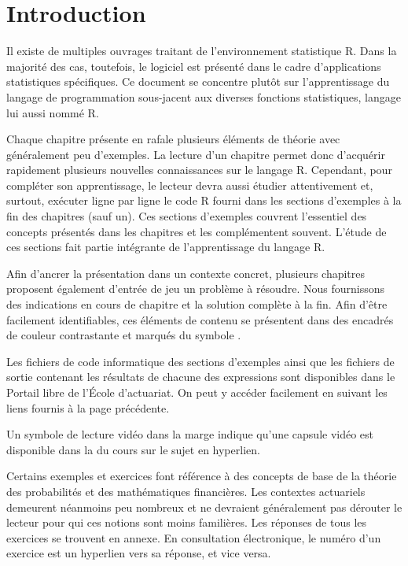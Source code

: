 \chapter*{Introduction}

Il existe de multiples ouvrages traitant de l'environnement
statistique R. Dans la majorité des cas, toutefois, le logiciel est
présenté dans le cadre d'applications statistiques spécifiques. Ce
document se concentre plutôt sur l'apprentissage du langage de
programmation sous-jacent aux diverses fonctions statistiques, langage
lui aussi nommé R.

Chaque chapitre présente en rafale plusieurs éléments de théorie avec
généralement peu d'exemples. La lecture d'un chapitre permet donc
d'acquérir rapidement plusieurs nouvelles connaissances sur le langage
R. Cependant, pour compléter son apprentissage, le lecteur devra aussi
étudier attentivement et, surtout, exécuter ligne par ligne le code R
fourni dans les sections d'exemples à la fin des chapitres (sauf un).
Ces sections d'exemples couvrent l'essentiel des concepts présentés
dans les chapitres et les complémentent souvent. L'étude de ces
sections fait partie intégrante de l'apprentissage du langage R.

Afin d'ancrer la présentation dans un contexte concret, plusieurs
chapitres proposent également d'entrée de jeu un problème à résoudre.
Nous fournissons des indications en cours de chapitre et la solution
complète à la fin. Afin d'être facilement identifiables, ces éléments
de contenu se présentent dans des encadrés de couleur contrastante et
marqués du symbole \faDotCircleO.

Les fichiers de code informatique des sections d'exemples ainsi que
les fichiers de sortie contenant les résultats de chacune des
expressions sont disponibles dans le Portail libre de l'École
d'actuariat. On peut y accéder facilement en suivant les liens fournis
à la page précédente.

Un symbole de lecture vidéo dans la marge indique qu'une capsule vidéo
est disponible dans la %
du cours sur le sujet en hyperlien.

Certains exemples et exercices font référence à des concepts de base
de la théorie des probabilités et des mathématiques financières. Les
contextes actuariels demeurent néanmoins peu nombreux et ne devraient
généralement pas dérouter le lecteur pour qui ces notions sont moins
familières. Les réponses de tous les exercices se trouvent en annexe.
En consultation électronique, le numéro d'un exercice est un hyperlien
vers sa réponse, et vice versa.

